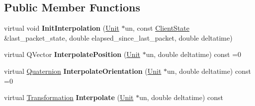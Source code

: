 \subsection*{Public Member Functions}
\begin{DoxyCompactItemize}
\item 
virtual void {\bfseries Init\+Interpolation} (\hyperlink{classUnit}{Unit} $\ast$un, const \hyperlink{classClientState}{Client\+State} \&last\+\_\+packet\+\_\+state, double elapsed\+\_\+since\+\_\+last\+\_\+packet, double deltatime)\hypertarget{classPrediction_a7b925382a9e9aeec0f0a1e373df3641f}{}\label{classPrediction_a7b925382a9e9aeec0f0a1e373df3641f}

\item 
virtual Q\+Vector {\bfseries Interpolate\+Position} (\hyperlink{classUnit}{Unit} $\ast$un, double deltatime) const =0\hypertarget{classPrediction_a6c0f4ba1a3b461989fb1805fe2ecd5f1}{}\label{classPrediction_a6c0f4ba1a3b461989fb1805fe2ecd5f1}

\item 
virtual \hyperlink{structQuaternion}{Quaternion} {\bfseries Interpolate\+Orientation} (\hyperlink{classUnit}{Unit} $\ast$un, double deltatime) const =0\hypertarget{classPrediction_afe9f89ae6290466ec8b31b890342d0b3}{}\label{classPrediction_afe9f89ae6290466ec8b31b890342d0b3}

\item 
virtual \hyperlink{structTransformation}{Transformation} {\bfseries Interpolate} (\hyperlink{classUnit}{Unit} $\ast$un, double deltatime) const \hypertarget{classPrediction_a75bf52c8b0bbef1e5a6fb23bdeab0c6e}{}\label{classPrediction_a75bf52c8b0bbef1e5a6fb23bdeab0c6e}

\end{DoxyCompactItemize}

